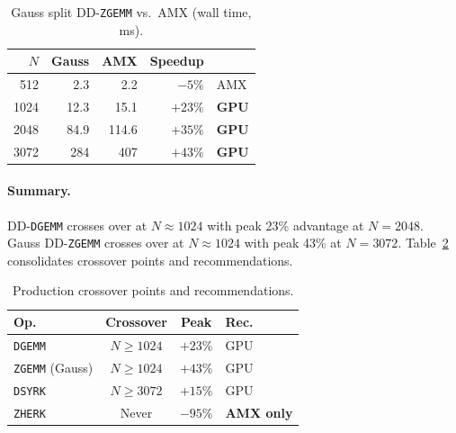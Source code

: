 \documentclass[conference]{IEEEtran}
\newcommand{\DGEMM}{\texttt{DGEMM}}
\newcommand{\ZGEMM}{\texttt{ZGEMM}}
\newcommand{\DSYRK}{\texttt{DSYRK}}
\newcommand{\ZHERK}{\texttt{ZHERK}}
\begin{document}
\begin{table}[t]
\centering
\caption{Gauss split DD-\ZGEMM{} vs.\ AMX (wall time, ms).}
\label{tab:zgemm-perf}
\begin{tabular}{r@{\hskip 8pt}r@{\hskip 8pt}r@{\hskip 8pt}r@{\hskip 8pt}l}
\toprule
$N$ & \textbf{Gauss} & \textbf{AMX} & \textbf{Speedup} & \\
\midrule
512  & 2.3  & 2.2  & $-5\%$  & AMX \\
1024 & 12.3 & 15.1 & $+23\%$ & \textbf{GPU} \\
2048 & 84.9 & 114.6 & $+35\%$ & \textbf{GPU} \\
3072 & 284  & 407  & $+43\%$ & \textbf{GPU} \\
\bottomrule
\end{tabular}
\end{table}
\paragraph{Summary.} DD-\DGEMM{} crosses over at $N{\approx}1024$ with peak 23\% advantage at $N{=}2048$. Gauss DD-\ZGEMM{} crosses over at $N{\approx}1024$ with peak 43\% at $N{=}3072$.
Table~\ref{tab:crossover} consolidates crossover points and recommendations.
\begin{table}[t]
\centering
\caption{Production crossover points and recommendations.}
\label{tab:crossover}
\begin{tabular}{l@{\hskip 6pt}c@{\hskip 6pt}c@{\hskip 6pt}l}
\toprule
\textbf{Op.} & \textbf{Crossover} & \textbf{Peak} & \textbf{Rec.} \\
\midrule
\DGEMM{} & $N \geq 1024$ & $+23\%$ & GPU \\
\ZGEMM{} (Gauss) & $N \geq 1024$ & $+43\%$ & GPU \\
\DSYRK{} & $N \geq 3072$ & $+15\%$ & GPU \\
\ZHERK{} & Never & $-95\%$ & \textbf{AMX only} \\
\bottomrule
\end{tabular}
\end{table}
\end{document}

